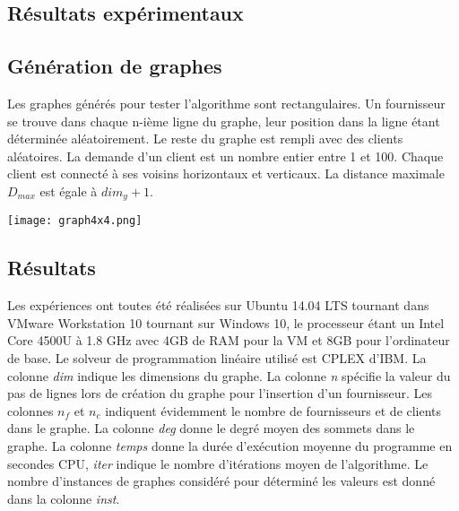 \documentclass[12pt,a4paper]{article}
\newenvironment{Figure}
  {\par\medskip\noindent\minipage{\linewidth}}
  {\endminipage\par\medskip}
\begin{document}
\begin{multicols}{2}
\section{Résultats expérimentaux}
\subsection{Génération de graphes}
Les graphes générés pour tester l'algorithme sont rectangulaires. Un fournisseur se trouve dans chaque n-ième ligne du graphe, leur position dans la ligne étant déterminée aléatoirement. Le reste du graphe est rempli avec des clients aléatoires. La demande d'un client est un nombre entier entre 1 et 100. Chaque client est connecté à ses voisins horizontaux et verticaux. La distance maximale $D_{max}$ est égale à $dim_{y}+1$.
%    
\begin{Figure}
	\centering
	\texttt{[image: graph4x4.png]}
	\label{fig:algo}
\end{Figure}
\subsection{Résultats}
Les expériences ont toutes été réalisées sur Ubuntu 14.04 LTS tournant dans VMware Workstation 10 tournant sur Windows 10, le processeur étant un Intel Core 4500U à 1.8 GHz avec 4GB de RAM pour la VM et 8GB pour l'ordinateur de base. Le solveur de programmation linéaire utilisé est CPLEX d'IBM.
La colonne \textit{dim} indique les dimensions du graphe. La colonne \textit{n} spécifie la valeur du pas de lignes lors de création du graphe pour l'insertion d'un fournisseur. Les colonnes $n_{f}$ et $n_{c}$ indiquent évidemment le nombre de fournisseurs et de clients dans le graphe. La colonne \textit{deg} donne le degré moyen des sommets dans le graphe. La colonne \textit{temps} donne la durée d'exécution moyenne du programme en secondes CPU, \textit{iter} indique le nombre d'itérations moyen de l'algorithme. Le nombre d'instances de graphes considéré pour déterminé les valeurs est donné dans la colonne \textit{inst}.

\end{multicols}
\end{document}
